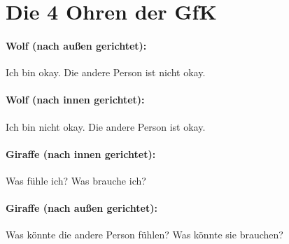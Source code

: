 \section{Die 4 Ohren der GfK}
\label{4-gfk-ohren}

\paragraph{Wolf (nach außen gerichtet):} Ich bin okay. Die andere Person ist nicht okay.

\paragraph{Wolf (nach innen gerichtet):} Ich bin nicht okay. Die andere Person ist okay.

\paragraph{Giraffe (nach innen gerichtet):} Was fühle ich? Was brauche ich?

\paragraph{Giraffe (nach außen gerichtet):} Was könnte die andere Person fühlen? Was könnte sie brauchen?
